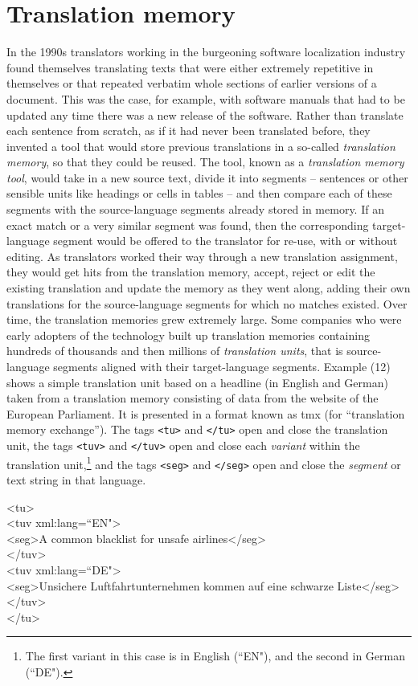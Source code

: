 \documentclass[output=paper]{langscibook}
\begin{document}
\section{Translation memory}\label{sec:kenny:4}
In the 1990s translators working in the burgeoning software localization industry found themselves translating texts that were either extremely repetitive in themselves or that repeated verbatim whole sections of earlier versions of a document. This was the case, for example,  with software manuals that had to be updated any time there was a new release of the software. Rather than translate each sentence from scratch, as if it had never been translated before, they invented a tool that would store previous translations in a so-called \textit{translation memory}, so that they could be reused. The tool, known as a  \textit{translation memory tool}, would take in a new source text, divide it into segments -- sentences or other sensible units like headings or cells in tables -- and then compare each of these segments with the source-language segments already stored in memory. If an exact match or a very similar segment was found, then the corresponding target-language segment would be offered to the translator for re-use, with or without editing. As  translators worked their way through a new translation assignment, they would get hits from the translation memory, accept, reject or edit the existing translation and update the memory as they went along, adding their own translations for the source-language segments for which no matches existed. Over time, the translation memories grew extremely large. Some companies who were early adopters of the technology built up translation memories containing hundreds of thousands and then millions of \textit{translation units}, that is source-language segments aligned with their target-language segments. Example (12) shows a simple translation unit based on a headline (in  English and German) taken from a translation memory consisting of data from the website of the European Parliament. It is presented in a format known as tmx (for “translation memory exchange”). The tags \texttt{<tu>} and \texttt{</tu>} open and close the translation unit, the tags \texttt{<tuv>} and \texttt{</tuv>} open and close each \textit{variant} within the translation unit,\footnote{The first variant in this case is in English (“EN"), and the second in German (“DE").} and the tags \texttt{<seg>} and \texttt{</seg>} open and close the \textit{segment} or text string in that language.   

\ea\ttfamily
<tu>\\
<tuv xml:lang=“EN">\\
<seg>A common blacklist for unsafe airlines</seg>\\
</tuv>\\
<tuv xml:lang=“DE">\\
<seg>Unsichere Luftfahrtunternehmen kommen auf eine schwarze Liste</seg>\\
</tuv>\\
</tu>\\
\z
\end{document}
